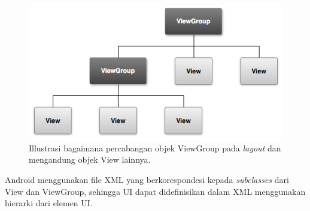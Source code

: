 \begin{figure}[htbp]
	\centering
		\includegraphics[scale=1]{Gambar/viewgroup.png}
	\caption{Illustrasi bagaimana percabangan objek ViewGroup pada \textit{layout} dan mengandung objek View lainnya.}
	\label{fig:viewgroup}
\end{figure}

Android menggunakan file XML yang berkorespondesi kepada \textit{subclasses} dari View dan ViewGroup, sehingga UI dapat didefinisikan dalam XML menggunakan hierarki dari elemen UI.

